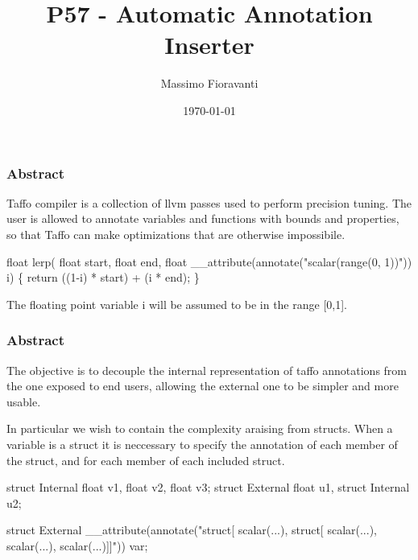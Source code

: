 \documentclass{beamer}
\title{P57 - Automatic Annotation Inserter}
\author{Massimo Fioravanti}
\institute{Stefano Cherubin}
\date{\today}
\begin{document}
\begin{frame}
	\titlepage
\end{frame}

\begin{frame}[fragile]
	\frametitle{Abstract}
	\begin{block}{}
		Taffo compiler is a collection of llvm passes used to perform precision tuning.
		The user is allowed to annotate variables and functions with bounds and properties, so that Taffo can make optimizations that are otherwise impossibile.
	\end{block}

	\begin{alertblock}{}
	\begin{semiverbatim}
		float lerp(
		\quad float start, 
		\quad float end, 
		\quad float __attribute(annotate("scalar(range(0, 1))")) i)
		\{
		\quad return ((1-i) * start) + (i * end);
		\}
	\end{semiverbatim}
	\end{alertblock}

	\begin{block}{}
		The floating point variable i will be assumed to be in the range [0,1].
	\end{block}
\end{frame}

\begin{frame}[fragile]
	\frametitle{Abstract}
	\begin{block}{}
		The objective is to decouple the internal representation of taffo annotations from the one exposed to end users, allowing the external one to be simpler and more usable.
	\end{block}

	\begin{block}{}
		In particular we wish to contain the complexity araising from structs.
		When a variable is a struct it is neccessary to specify the annotation of each member of the struct, and for each member of each included struct.
	\end{block}
	
	\begin{alertblock}{}
	\begin{semiverbatim}	
		struct Internal {float v1, float v2, float v3};
		struct External {float u1, struct Internal u2};
		
		struct External __attribute(annotate("struct[
		\quad scalar(...), struct[
		\quad \quad scalar(...), 
		\quad \quad scalar(...), 
		\quad \quad scalar(...)]]")) var;
	\end{semiverbatim}
	\end{alertblock}
\end{frame}
\end{document}
